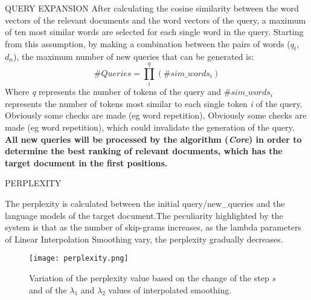 \begin{frame}{QUERY EXPANSION}
    After calculating the cosine similarity between the word vectors of the 
    relevant documents and the word vectors of the query, a maximum of ten 
    most similar words are selected for each single word in the query. Starting 
    from this assumption, by making a combination between the pairs of 
    words ($q_t$, $d_n$), the maximum number of new queries that can be 
    generated is: 
    $$ \#Queries = \prod_i^q (\#sim\_words_i) $$
    Where \emph{q} represents the number of tokens of the query and \emph{$\#sim\_words_i$} 
    represents the number of tokens most similar to each single token \emph{i} of the 
    query. Obviously some checks are made (eg word repetition), Obviously 
    some checks are made (eg word repetition), which could invalidate the 
    generation of the query. \bfseries All new queries will be processed by the 
    algorithm (\emph{Core}) in order to determine the best ranking of relevant 
    documents, which has the target document in the first positions.
\end{frame}

\begin{frame}{PERPLEXITY}
    \begin{minipage}{\linewidth}
        \centering
        \begin{minipage}{0.35\linewidth}
            The perplexity is calculated 
            between the initial 
            query/new\_queries and the language 
            models of the target document.The peculiarity 
            highlighted by the 
            system is that as the 
            number of skip-grams increases, 
            as the lambda parameters 
            of Linear Interpolation 
            Smoothing vary, 
            the perplexity gradually 
            decreases.
        \end{minipage}
        \hspace{0.01\linewidth}
        \begin{minipage}{0.55\linewidth}
            \begin{figure}[H]
                \centering
                \texttt{[image: perplexity.png]}
                \centering
                \caption{Variation of the perplexity value based on the change of the step \emph{s} and of the $\lambda_1$ and $\lambda_2$ values of interpolated smoothing.}
                \label{perplexity}
            \end{figure}
        \end{minipage}
    \end{minipage}
\end{frame}


